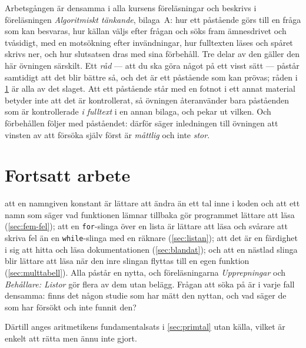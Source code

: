 Arbetsgången är densamma i alla kursens föreläsningar och beskrivs i
föreläsningen \emph{Algoritmiskt tänkande}, bilaga~A: hur ett påstående
görs till en fråga som kan besvaras, hur källan väljs efter frågan och
söks fram ämnesdrivet och tvåsidigt, med en motsökning efter
invändningar, hur fulltexten läses och spåret skrivs ner, och hur
slutsatsen dras med sina förbehåll.  Tre delar av den gäller den här
övningen särskilt.  Ett \emph{råd} --- att du ska göra något på ett
visst sätt --- påstår samtidigt att det blir bättre så, och det är ett
påstående som kan prövas; råden i \cref{sec:fortsatt} är alla av det
slaget.  Att ett påstående står med en fotnot i ett annat material
betyder inte att det är kontrollerat, så övningen återanvänder bara
påståenden som är kontrollerade \emph{i fulltext} i en annan bilaga, och
pekar ut vilken.  Och förbehållen följer med påståendet: därför säger
inledningen till övningen att vinsten av att försöka själv först är
\emph{måttlig} och inte \emph{stor}.

\section{Fortsatt arbete}
\label{sec:fortsatt}

 att en namngiven konstant är
lättare att ändra än ett tal inne i koden och att ett namn som säger vad
funktionen lämnar
tillbaka gör programmet lättare att läsa (\cref{sec:fem-fel}); att en
\texttt{for}-slinga över en lista är lättare att läsa och
svårare att skriva fel än en \texttt{while}-slinga med en
räknare (\cref{sec:listan}); att det är en färdighet i sig att hitta och
läsa dokumentationen (\cref{sec:blandat}); och att en nästlad slinga blir
lättare att läsa när den inre slingan flyttas till en egen funktion
(\cref{sec:multtabell}).  Alla påstår en nytta, och föreläsningarna
\emph{Upprepningar} och \emph{Behållare: Listor} gör flera av dem utan
belägg.  Frågan att söka på är i
varje fall densamma: finns det någon studie som har mätt den nyttan, och
vad säger de som har försökt och inte funnit den?

Därtill anges aritmetikens fundamentalsats i \cref{sec:primtal} utan
källa, vilket är enkelt att rätta men ännu inte gjort.
